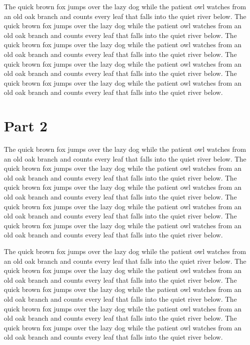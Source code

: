 The quick brown fox jumps over the lazy dog while the patient owl watches from an old oak branch and counts every leaf that falls into the quiet river below. The quick brown fox jumps over the lazy dog while the patient owl watches from an old oak branch and counts every leaf that falls into the quiet river below. The quick brown fox jumps over the lazy dog while the patient owl watches from an old oak branch and counts every leaf that falls into the quiet river below. The quick brown fox jumps over the lazy dog while the patient owl watches from an old oak branch and counts every leaf that falls into the quiet river below. The quick brown fox jumps over the lazy dog while the patient owl watches from an old oak branch and counts every leaf that falls into the quiet river below.
\newpage
\section{Part 2}
The quick brown fox jumps over the lazy dog while the patient owl watches from an old oak branch and counts every leaf that falls into the quiet river below. The quick brown fox jumps over the lazy dog while the patient owl watches from an old oak branch and counts every leaf that falls into the quiet river below. The quick brown fox jumps over the lazy dog while the patient owl watches from an old oak branch and counts every leaf that falls into the quiet river below. The quick brown fox jumps over the lazy dog while the patient owl watches from an old oak branch and counts every leaf that falls into the quiet river below. The quick brown fox jumps over the lazy dog while the patient owl watches from an old oak branch and counts every leaf that falls into the quiet river below.

The quick brown fox jumps over the lazy dog while the patient owl watches from an old oak branch and counts every leaf that falls into the quiet river below. The quick brown fox jumps over the lazy dog while the patient owl watches from an old oak branch and counts every leaf that falls into the quiet river below. The quick brown fox jumps over the lazy dog while the patient owl watches from an old oak branch and counts every leaf that falls into the quiet river below. The quick brown fox jumps over the lazy dog while the patient owl watches from an old oak branch and counts every leaf that falls into the quiet river below. The quick brown fox jumps over the lazy dog while the patient owl watches from an old oak branch and counts every leaf that falls into the quiet river below.


